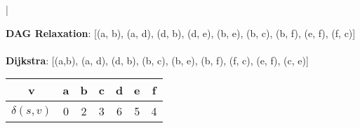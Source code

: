 \documentclass[12pt,twoside]{article}
\begin{document}


\begin{problems}

\problem  %
|
\begin{problemparts}
\problempart %
  \textbf{DAG Relaxation}: [(a, b), (a, d), (d, b), (d, e), (b, e), (b, c), (b, f), (e, f), (f, c)] \\
  \\
  \textbf{Dijkstra}: [(a,b), (a, d), (d, b), (b, c), (b, e), (b, f), (f, c), (e, f), (c, e)] \\
\problempart %
  \begin{tabular}{c|c c c c c c}
    v & a & b & c & d & e & f \\
  \hline
    $\delta(s, v)$ & 0 & 2 & 3 & 6 & 5 & 4 \\
  \end{tabular}
\end{problemparts}


\end{problems}
\end{document}
